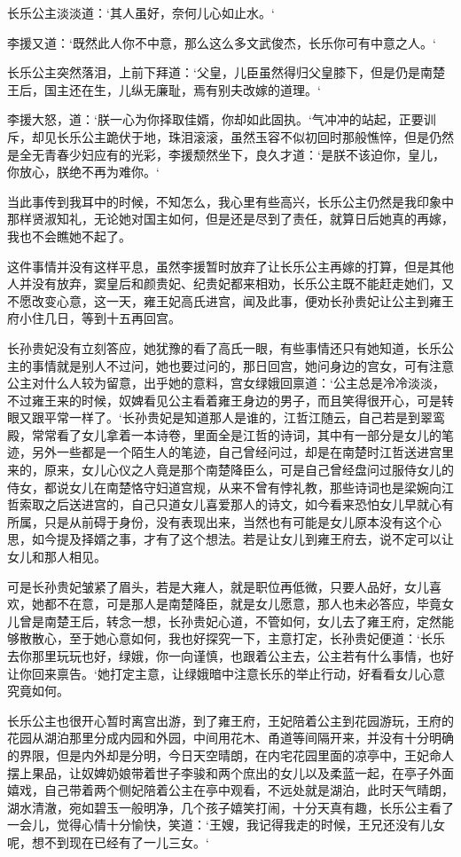 长乐公主淡淡道：‘其人虽好，奈何儿心如止水。‘

李援又道：‘既然此人你不中意，那么这么多文武俊杰，长乐你可有中意之人。‘

长乐公主突然落泪，上前下拜道：‘父皇，儿臣虽然得归父皇膝下，但是仍是南楚王后，国主还在生，儿纵无廉耻，焉有别夫改嫁的道理。‘

李援大怒，道：‘朕一心为你择取佳婿，你却如此固执。‘气冲冲的站起，正要训斥，却见长乐公主跪伏于地，珠泪滚滚，虽然玉容不似初回时那般憔悴，但是仍然是全无青春少妇应有的光彩，李援颓然坐下，良久才道：‘是朕不该迫你，皇儿，你放心，朕绝不再为难你。‘

当此事传到我耳中的时候，不知怎么，我心里有些高兴，长乐公主仍然是我印象中那样贤淑知礼，无论她对国主如何，但是还是尽到了责任，就算日后她真的再嫁，我也不会瞧她不起了。

这件事情并没有这样平息，虽然李援暂时放弃了让长乐公主再嫁的打算，但是其他人并没有放弃，窦皇后和颜贵妃、纪贵妃都来相劝，长乐公主既不能赶走她们，又不愿改变心意，这一天，雍王妃高氏进宫，闻及此事，便劝长孙贵妃让公主到雍王府小住几日，等到十五再回宫。

长孙贵妃没有立刻答应，她犹豫的看了高氏一眼，有些事情还只有她知道，长乐公主的事情就是别人不过问，她也要过问的，那日回宫，她问身边的宫女，可有注意公主对什么人较为留意，出乎她的意料，宫女绿娥回禀道：‘公主总是冷冷淡淡，不过雍王来的时候，奴婢看见公主看着雍王身边的男子，而且笑得很开心，可是转眼又跟平常一样了。‘长孙贵妃是知道那人是谁的，江哲江随云，自己若是到翠鸾殿，常常看了女儿拿着一本诗卷，里面全是江哲的诗词，其中有一部分是女儿的笔迹，另外一些都是一个陌生人的笔迹，自己曾经问过，却是在南楚时江哲送进宫里来的，原来，女儿心仪之人竟是那个南楚降臣么，可是自己曾经盘问过服侍女儿的侍女，都说女儿在南楚恪守妇道宫规，从来不曾有悖礼教，那些诗词也是梁婉向江哲索取之后送进宫的，自己只道女儿喜爱那人的诗文，如今看来恐怕女儿早就心有所属，只是从前碍于身份，没有表现出来，当然也有可能是女儿原本没有这个心思，如今提及择婿之事，才有了这个想法。若是让女儿到雍王府去，说不定可以让女儿和那人相见。

可是长孙贵妃皱紧了眉头，若是大雍人，就是职位再低微，只要人品好，女儿喜欢，她都不在意，可是那人是南楚降臣，就是女儿愿意，那人也未必答应，毕竟女儿曾是南楚王后，转念一想，长孙贵妃心道，不管如何，女儿去了雍王府，定然能够散散心，至于她心意如何，我也好探究一下，主意打定，长孙贵妃便道：‘长乐去你那里玩玩也好，绿娥，你一向谨慎，也跟着公主去，公主若有什么事情，也好让你回来禀告。‘她打定主意，让绿娥暗中注意长乐的举止行动，好看看女儿心意究竟如何。

长乐公主也很开心暂时离宫出游，到了雍王府，王妃陪着公主到花园游玩，王府的花园从湖泊那里分成内园和外园，中间用花木、甬道等间隔开来，并没有十分明确的界限，但是内外却是分明，今日天空晴朗，在内宅花园里面的凉亭中，王妃命人摆上果品，让奴婢奶娘带着世子李骏和两个庶出的女儿以及柔蓝一起，在亭子外面嬉戏，自己带着两个侧妃陪着公主在亭中观看，不远处就是湖泊，此时天气晴朗，湖水清澈，宛如碧玉一般明净，几个孩子嬉笑打闹，十分天真有趣，长乐公主看了一会儿，觉得心情十分愉快，笑道：‘王嫂，我记得我走的时候，王兄还没有儿女呢，想不到现在已经有了一儿三女。‘

